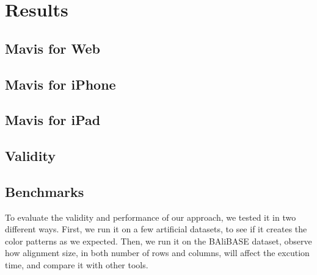 \chapter{Results}\label{chap:Results}

\section{Mavis for Web}

\section{Mavis for iPhone}

\section{Mavis for iPad}

\section{Validity}

\section{Benchmarks}

To evaluate the validity and performance of our approach, we tested it in two different ways. First, we run it on a few artificial datasets, to see if it creates the color patterns as we expected. Then, we run it on the BAliBASE dataset, observe how alignment size, in both number of rows and columns, will affect the excution time, and compare it with other tools.